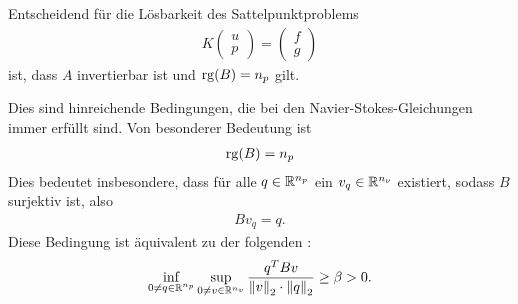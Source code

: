 Entscheidend für die Lösbarkeit des Sattelpunktproblems
\begin{align*}
  K
  \begin{pmatrix}
    u\\p
  \end{pmatrix}
=
\begin{pmatrix}
  f\\g
\end{pmatrix}
\end{align*}
ist, dass $A$ invertierbar ist und $\operatorname{rg}(B) = n_{p}$ gilt.
\begin{bemerkung*}
  Dies sind hinreichende Bedingungen, die bei den Navier-Stokes-Gleichungen immer erfüllt sind. Von besonderer Bedeutung ist
  \begin{align*}
    \operatorname{rg}(B) = n_{p}
  \end{align*}
Dies bedeutet insbesondere, dass für alle $q \in \mathbb{R}^{n_{p}}$ ein $v_{q} \in \mathbb{R}^{n_{\nu}}$ existiert, sodass $B$ surjektiv ist, also
\begin{align*}
  Bv_{q} = q.
\end{align*}
Diese Bedingung ist äquivalent zu der folgenden :
\begin{align}\label{eq:infsup}
  \inf_{0 \neq q \in \mathbb{R}^{n_{p}}} \sup_{ 0 \neq v \in \mathbb{R}^{n_{v}}} \frac {q^{T}Bv}{\left \|v \right\|_{2} \cdot \left \|q \right\|_{2}}\geq \beta > 0.
\end{align}
\end{bemerkung*}
